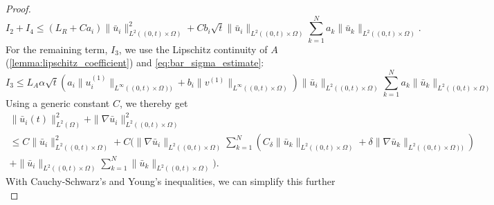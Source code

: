 \documentclass[reqno, 11pt]{amsart}
\numberwithin{equation}{section}
\begin{document}
\begin{proof}
\begin{equation}
I_2+I_4
\leq (L_R+C a_i)\|\bar{u}_i\|_{L^2((0,t)\times\Omega)}^2+C b_i\sqrt{t}\|\bar{u}_i\|_{L^2((0,t)\times\Omega)}\sum_{k=1}^N a_k\|\bar{u}_k\|_{L^2((0,t)\times\Omega)}.
\end{equation}
%
For the remaining term, $I_3$, we use the Lipschitz continuity of $A$ (\cref{lemma:lipschitz_coefficient}) and \cref{eq:bar_sigma_estimate}:
%
\begin{equation}\label{eq:estimate_I3}
I_3
\leq L_A\alpha\sqrt{t}\left(a_i\|u_i^{(1)}\|_{L^\infty((0,t)\times\Omega))}+ b_i\|v^{(1)}\|_{L^\infty((0,t)\times\Omega)}\right)\|\bar{u}_i\|_{L^2((0,t)\times\Omega)}\sum_{k=1}^N a_k\|\bar{u}_k\|_{L^2((0,t)\times\Omega)}
\end{equation}
%
Using a generic constant $C$, we thereby get
%
%
\begin{multline*}
\|\bar{u}_i(t)\|_{L^2(\Omega)}^2+\|\nabla\bar{u}_i\|_{L^2((0,t)\times\Omega)}^2\\
\leq C\|\bar{u}_i\|_{L^2((0,t)\times\Omega)}^2
+C\bigg(\|\nabla\bar{u}_i\|_{L^2((0,t)\times\Omega)}\sum_{k=1}^N\left(C_\delta\|\bar{u}_k\|_{L^{2}((0,t)\times\Omega)}+\delta\|\nabla\bar{u}_k\|_{L^{2}((0,t)\times\Omega))}\right)\\
+\|\bar{u}_i\|_{L^2((0,t)\times\Omega)}\sum_{k=1}^N\|\bar{u}_k\|_{L^2((0,t)\times\Omega)}\bigg).
\end{multline*}
%
With Cauchy-Schwarz's and Young's inequalities, we can simplify this further 
%
\begin{equation*}

\end{equation*}
\end{proof}
\end{document}
